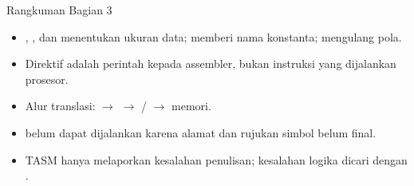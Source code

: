 \documentclass[aspectratio=169,11pt]{beamer}
\begin{document}
\begin{frame}{Rangkuman Bagian 3}
\small
\begin{itemize}
    \item {}, , dan  menentukan ukuran data;
           memberi nama konstanta;  mengulang
          pola.

    \vspace{0.15em}
    \item Direktif adalah perintah kepada assembler, bukan
          instruksi yang dijalankan prosesor.

    \vspace{0.15em}
    \item Alur translasi:  $\rightarrow$ 
          $\rightarrow$ / $\rightarrow$
          memori.

    \vspace{0.15em}
    \item {} belum dapat dijalankan karena alamat dan
          rujukan simbol belum final.

    \vspace{0.15em}
    \item TASM hanya melaporkan kesalahan penulisan; kesalahan
          logika dicari dengan .
\end{itemize}
\end{frame}
\end{document}
